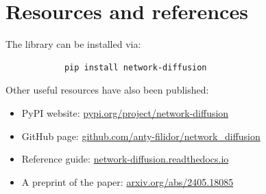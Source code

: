 \documentclass{beamer}
\begin{document}
\section{Resources and references}

\begin{frame}[fragile]{\secname}
    The library can be installed via:
    \begin{center}
        \large
        \begin{verbatim}
            pip install network-diffusion
        \end{verbatim}
    \end{center}
    Other useful resources have also been published:
    \begin{itemize}
        \item PyPI website: \url{pypi.org/project/network-diffusion}
        \item GitHub page: \url{github.com/anty-filidor/network_diffusion}
        \item Reference guide: \url{network-diffusion.readthedocs.io}
        \item A preprint of the paper: \url{arxiv.org/abs/2405.18085}
    \end{itemize}
\end{frame}






\end{document}
